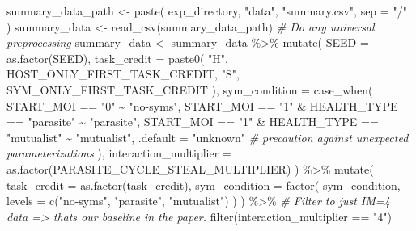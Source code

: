 \documentclass[
]{book}
\newenvironment{Shaded}{\begin{snugshade}}{\end{snugshade}}
\newcommand{\AttributeTok}[1]{\textcolor[rgb]{0.77,0.63,0.00}{#1}}
\newcommand{\CommentTok}[1]{\textcolor[rgb]{0.56,0.35,0.01}{\textit{#1}}}
\newcommand{\FunctionTok}[1]{\textcolor[rgb]{0.00,0.00,0.00}{#1}}
\newcommand{\NormalTok}[1]{#1}
\newcommand{\OtherTok}[1]{\textcolor[rgb]{0.56,0.35,0.01}{#1}}
\newcommand{\SpecialCharTok}[1]{\textcolor[rgb]{0.00,0.00,0.00}{#1}}
\newcommand{\StringTok}[1]{\textcolor[rgb]{0.31,0.60,0.02}{#1}}
\begin{document}
\begin{Shaded}
\begin{Highlighting}[]
\NormalTok{summary\_data\_path }\OtherTok{\textless{}{-}} \FunctionTok{paste}\NormalTok{(}
\NormalTok{  exp\_directory,}
  \StringTok{"data"}\NormalTok{,}
  \StringTok{"summary.csv"}\NormalTok{,}
  \AttributeTok{sep =} \StringTok{"/"}
\NormalTok{)}
\NormalTok{summary\_data }\OtherTok{\textless{}{-}} \FunctionTok{read\_csv}\NormalTok{(summary\_data\_path)}
\CommentTok{\# Do any universal preprocessing}
\NormalTok{summary\_data }\OtherTok{\textless{}{-}}\NormalTok{ summary\_data }\SpecialCharTok{\%\textgreater{}\%}
  \FunctionTok{mutate}\NormalTok{(}
    \AttributeTok{SEED =} \FunctionTok{as.factor}\NormalTok{(SEED),}
    \AttributeTok{task\_credit =} \FunctionTok{paste0}\NormalTok{(}
      \StringTok{"H"}\NormalTok{, HOST\_ONLY\_FIRST\_TASK\_CREDIT,}
      \StringTok{"S"}\NormalTok{, SYM\_ONLY\_FIRST\_TASK\_CREDIT}
\NormalTok{    ),}
    \AttributeTok{sym\_condition =} \FunctionTok{case\_when}\NormalTok{(}
\NormalTok{      START\_MOI }\SpecialCharTok{==} \StringTok{"0"} \SpecialCharTok{\textasciitilde{}} \StringTok{"no{-}syms"}\NormalTok{,}
\NormalTok{      START\_MOI }\SpecialCharTok{==} \StringTok{"1"} \SpecialCharTok{\&}\NormalTok{ HEALTH\_TYPE }\SpecialCharTok{==} \StringTok{"parasite"} \SpecialCharTok{\textasciitilde{}} \StringTok{"parasite"}\NormalTok{,}
\NormalTok{      START\_MOI }\SpecialCharTok{==} \StringTok{"1"} \SpecialCharTok{\&}\NormalTok{ HEALTH\_TYPE }\SpecialCharTok{==} \StringTok{"mutualist"} \SpecialCharTok{\textasciitilde{}} \StringTok{"mutualist"}\NormalTok{,}
      \AttributeTok{.default =} \StringTok{"unknown"} \CommentTok{\# precaution against unexpected parameterizations}
\NormalTok{    ),}
    \AttributeTok{interaction\_multiplier =} \FunctionTok{as.factor}\NormalTok{(PARASITE\_CYCLE\_STEAL\_MULTIPLIER)}
\NormalTok{  ) }\SpecialCharTok{\%\textgreater{}\%}
  \FunctionTok{mutate}\NormalTok{(}
    \AttributeTok{task\_credit =} \FunctionTok{as.factor}\NormalTok{(task\_credit),}
    \AttributeTok{sym\_condition =} \FunctionTok{factor}\NormalTok{(}
\NormalTok{      sym\_condition,}
      \AttributeTok{levels =} \FunctionTok{c}\NormalTok{(}\StringTok{"no{-}syms"}\NormalTok{, }\StringTok{"parasite"}\NormalTok{, }\StringTok{"mutualist"}\NormalTok{)}
\NormalTok{    )}
\NormalTok{  ) }\SpecialCharTok{\%\textgreater{}\%}
  \CommentTok{\# Filter to just IM=4 data =\textgreater{} that\textquotesingle{}s our baseline in the paper.}
  \FunctionTok{filter}\NormalTok{(interaction\_multiplier }\SpecialCharTok{==} \StringTok{"4"}\NormalTok{)}
\end{Highlighting}
\end{Shaded}
\end{document}
